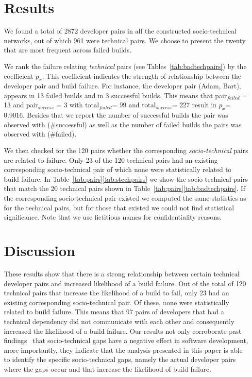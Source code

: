 \documentclass[conference]{IEEEtran}
\begin{document}
\section{Results}
We found a total of 2872 developer pairs in all the constructed
socio-technical networks, out of which 961 were technical pairs. 
We choose to present the twenty that are most frequent across failed builds.

We rank the failure relating \emph{technical} pairs (see Tables~\ref{tab:badtechpairs})
by the coefficient $p_{x}$. This coefficient indicates the strength of
relationship between the developer pair and build failure. For instance, the
developer pair (Adam, Bart), appears in 13 failed builds and in 3
successful builds. This means that pair$_{failed}$ = 13 and pair$_{success}$ = 3
with total$_{failed}$= 99 and total$_{success}$= 227 result in $p_x$= 0.9016.
Besides that we report the number of successful builds the pair was observed with
(\#successful) as well as the number of failed builds the pairs was observed with
(\#failed). 

We then checked for the 120 pairs whether the corresponding \emph{socio-technical} pairs are related to failure.
Only 23 of the 120 technical pairs had an existing corresponding socio-technical pair of which none were statistically related to build failure. 
In Table~\ref{tab:pairs}\ref{tab:stechpairs} we show the socio-technical pairs that match the 20 technical pairs shown in Table~\ref{tab:pairs}\ref{tab:badtechpairs}.
If the corresponding socio-technical pair existed we computed the same statistics as for the technical pairs, but for those that existed we could not find statistical significance.
Note that we use fictitious names for confidentiality reasons.


\section{Discussion}
These results show that there is a strong relationship between certain technical
developer pairs and increased likelihood of a build failure.
Out of the total of 120 technical pairs that increase the likelihood of a
build to fail, only 23 had an existing
corresponding socio-technical pair. Of these, none were statistically
related to build failure. This means that 97 pairs of developers that had a
technical dependency did not communicate with each other and
consequently increased the likelihood of a build failure. Our results not only
corroborate past findings~\cite{cataldo:cscw:2006,cataldo:esem:2008} that socio-technical gaps
have a negative effect in software development, more importantly, they indicate
that the analysis presented in this paper is able to identify the specific
socio-technical gaps, namely the actual developer pairs where the gaps occur
and that increase the likelihood of build failure. 
\end{document}
